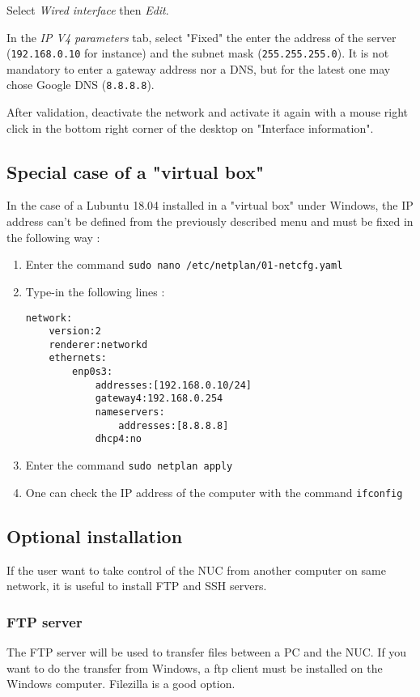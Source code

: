 \documentclass[a4paper]{ffco-rapport}
\begin{document}
	Select \emph{Wired interface} then \emph{Edit}.
	
	In the \emph{IP V4 parameters} tab, select "Fixed" the enter the address of the server (\texttt{192.168.0.10} for instance) and the subnet mask (\texttt{255.255.255.0}).
	It is not mandatory to enter a gateway address nor a DNS, but for the latest one may chose Google DNS (\texttt{8.8.8.8}).

	After validation, deactivate the network and activate it again with a mouse right click in the bottom right corner of the desktop on "Interface information".
	
	\subsection{Special case of a "virtual box"}
		In the case of a Lubuntu 18.04 installed in a "virtual box" under Windows, the IP address can't be defined from the previously described menu and must be fixed in the following way :
		
		\begin{enumerate}
			\item Enter the command \verb|sudo nano /etc/netplan/01-netcfg.yaml|
			\item Type-in the following lines :
				\begin{verbatim}
network:
	version:2
	renderer:networkd
	ethernets:
		enp0s3:
			addresses:[192.168.0.10/24]
			gateway4:192.168.0.254
			nameservers:
				addresses:[8.8.8.8]
			dhcp4:no
				\end{verbatim}
			\item Enter the command \verb|sudo netplan apply|
			\item One can check the IP address of the computer with the command \verb|ifconfig|
		\end{enumerate}
	
	\subsection{Optional installation}
		If the user want to take control of the NUC from another computer on same network, it is useful to install FTP and SSH servers.
	
	\subsubsection{FTP server}
		The FTP server will be used to transfer files between a PC and the NUC. If you want to do the transfer from Windows, a ftp client must be installed on the Windows computer. Filezilla is a good option.
\end{document}
